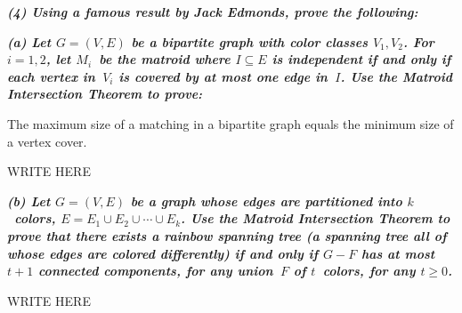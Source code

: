 \textbf{\textit{(4) Using a famous result by Jack Edmonds, prove the following:}}

\hspace{5pt}\textbf{\textit{(a) Let $G=(V,E)$ be a bipartite graph with color classes $V_1,V_2$. For $i=1,2$, let $M_i$~be the matroid where $I\subseteq E$ is independent if and only if each vertex in~$V_i$ is covered by at most one edge in~$I$. Use the Matroid Intersection Theorem to prove:}}
    \begin{theoremstar}
      The maximum size of a matching in a bipartite graph equals the minimum size of a vertex cover.
    \end{theoremstar}

\vspace{3pt}

WRITE HERE

\vspace{3pt}

\hspace{5pt}\textbf{\textit{(b) Let $G=(V,E)$ be a graph whose edges are partitioned into $k$~colors, $E=E_1\cup E_2\cup\cdots\cup E_k$. Use the Matroid Intersection Theorem to prove that there exists a rainbow spanning tree (a spanning tree all of whose edges are colored differently) if and only if $G-F$ has at most $t+1$ connected components, for any union~$F$ of $t$~colors, for any $t\ge0$.}}

\vspace{3pt}

WRITE HERE
